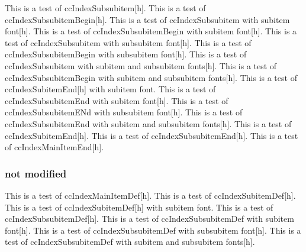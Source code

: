 \documentclass{article}
\begin{document}
{{{{This is a test of ccIndexSubsubitem[h].
This is a test of ccIndexSubsubitemBegin[h].
This is a test of ccIndexSubsubitem with subitem font[h].
This is a test of ccIndexSubsubitemBegin with subitem font[h].
This is a test of ccIndexSubsubitem with subsubitem font[h].
This is a test of ccIndexSubsubitemBegin with subsubitem font[h].
This is a test of ccIndexSubsubitem with subitem and subsubitem fonts[h].
This is a test of ccIndexSubsubitemBegin with subitem and subsubitem fonts[h].
\pagebreak
This is a test of ccIndexSubitemEnd[h] with subitem font.
This is a test of ccIndexSubsubitemEnd with subitem font[h].
This is a test of ccIndexSubsubitemENd with subsubitem font[h].
This is a test of ccIndexSubsubitemEnd with subitem and subsubitem fonts[h].
This is a test of ccIndexSubitemEnd[h].
This is a test of ccIndexSubsubitemEnd[h].
This is a test of ccIndexMainItemEnd[h].

\subsubsection{not modified}

This is a test of ccIndexMainItemDef[h].
This is a test of ccIndexSubitemDef[h].
This is a test of ccIndexSubitemDef[h] with subitem font.
This is a test of ccIndexSubsubitemDef[h].
This is a test of ccIndexSubsubitemDef with subitem font[h].
This is a test of ccIndexSubsubitemDef with subsubitem font[h].
This is a test of ccIndexSubsubitemDef with subitem and subsubitem fonts[h].

}}}}
\end{document}
